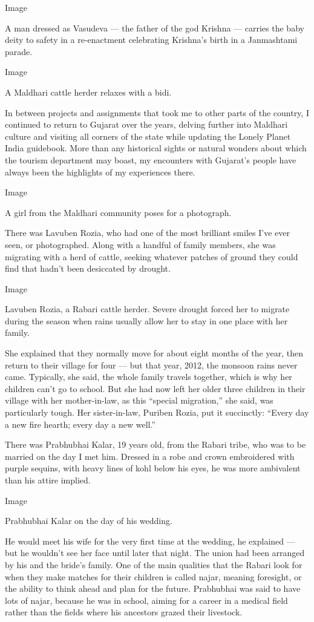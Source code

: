 Image

A man dressed as Vasudeva --- the father of the god Krishna --- carries
the baby deity to safety in a re-enactment celebrating Krishna's birth
in a Janmashtami parade.

Image

A Maldhari cattle herder relaxes with a bidi.

In between projects and assignments that took me to other parts of the
country, I continued to return to Gujarat over the years, delving
further into Maldhari culture and visiting all corners of the state
while updating the Lonely Planet India guidebook. More than any
historical sights or natural wonders about which the tourism department
may boast, my encounters with Gujarat's people have always been the
highlights of my experiences there.

Image

A girl from the Maldhari community poses for a photograph.

There was Lavuben Rozia, who had one of the most brilliant smiles I've
ever seen, or photographed. Along with a handful of family members, she
was migrating with a herd of cattle, seeking whatever patches of ground
they could find that hadn't been desiccated by drought.

Image

Lavuben Rozia, a Rabari cattle herder. Severe drought forced her to
migrate during the season when rains usually allow her to stay in one
place with her family.

She explained that they normally move for about eight months of the
year, then return to their village for four --- but that year, 2012, the
monsoon rains never came. Typically, she said, the whole family travels
together, which is why her children can't go to school. But she had now
left her older three children in their village with her mother-in-law,
as this ``special migration,'' she said, was particularly tough. Her
sister-in-law, Puriben Rozia, put it succinctly: ``Every day a new fire
hearth; every day a new well.''

There was Prabhubhai Kalar, 19 years old, from the Rabari tribe, who was
to be married on the day I met him. Dressed in a robe and crown
embroidered with purple sequins, with heavy lines of kohl below his
eyes, he was more ambivalent than his attire implied.

Image

Prabhubhai Kalar on the day of his wedding.

He would meet his wife for the very first time at the wedding, he
explained --- but he wouldn't see her face until later that night. The
union had been arranged by his and the bride's family. One of the main
qualities that the Rabari look for when they make matches for their
children is called najar, meaning foresight, or the ability to think
ahead and plan for the future. Prabhubhai was said to have lots of
najar, because he was in school, aiming for a career in a medical field
rather than the fields where his ancestors grazed their livestock.

